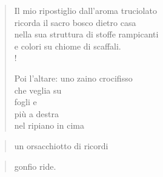 
\begin{verse}

    Il mio ripostiglio dall'aroma truciolato\\
    ricorda il sacro bosco dietro casa\\
    nella sua struttura di stoffe rampicanti\\
    e colori su chiome di scaffali.\\!

    Poi l'altare: uno zaino crocifisso\\
    che veglia su\\
    fogli e\\
    più a destra \\
    nel ripiano in cima\\
\end{verse}

\vspace{-0.9cm}
    \begin{verse}
    un orsacchiotto \hfill di ricordi
    \end{verse}
\vspace{-0.9cm}

\begin{verse}
    gonfio ride.\\
\end{verse}

    
    




    
